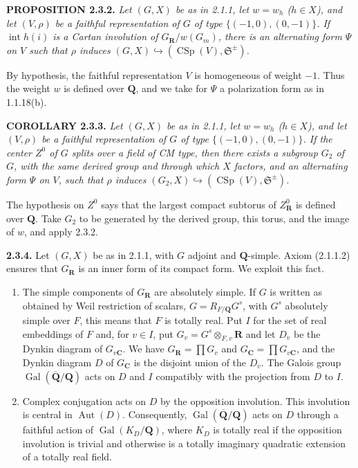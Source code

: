 \documentclass[10pt,a4paper]{article}
\begin{document}
\textbf{PROPOSITION 2.3.2.} \emph{Let \((G,X)\) be as in 2.1.1, let \(w=w_h\) (\(h\in X\)), and let \((V,\rho)\) be a faithful representation of \(G\) of type \(\{(-1,0),(0,-1)\}\). If \(\operatorname{int}h(i)\) is a Cartan involution of \(G_{\mathbf R}/w(G_m)\), there is an alternating form \(\Psi\) on \(V\) such that \(\rho\) induces \((G,X)\hookrightarrow(\operatorname{CSp}(V),\mathfrak S^{\pm})\).}

By hypothesis, the faithful representation \(V\) is homogeneous of weight \(-1\). Thus the weight \(w\) is defined over \(\mathbf Q\), and we take for \(\Psi\) a polarization form as in 1.1.18(b).

\textbf{COROLLARY 2.3.3.} \emph{Let \((G,X)\) be as in 2.1.1, let \(w=w_h\) (\(h\in X\)), and let \((V,\rho)\) be a faithful representation of \(G\) of type \(\{(-1,0),(0,-1)\}\). If the center \(Z^0\) of \(G\) splits over a field of CM type, then there exists a subgroup \(G_2\) of \(G\), with the same derived group and through which \(X\) factors, and an alternating form \(\Psi\) on \(V\), such that \(\rho\) induces \((G_2,X)\hookrightarrow(\operatorname{CSp}(V),\mathfrak S^{\pm})\).}

The hypothesis on \(Z^0\) says that the largest compact subtorus of \(Z_{\mathbf R}^0\) is defined over \(\mathbf Q\). Take \(G_2\) to be generated by the derived group, this torus, and the image of \(w\), and apply 2.3.2.

\textbf{2.3.4.} Let \((G,X)\) be as in 2.1.1, with \(G\) adjoint and \(\mathbf Q\)-simple. Axiom (2.1.1.2) ensures that \(G_{\mathbf R}\) is an inner form of its compact form. We exploit this fact.

\begin{enumerate}
\def\labelenumi{(\alph{enumi})}
\item
  The simple components of \(G_{\mathbf R}\) are absolutely simple. If \(G\) is written as obtained by Weil restriction of scalars, \(G=R_{F/\mathbf Q}G^s\), with \(G^s\) absolutely simple over \(F\), this means that \(F\) is totally real. Put \(I\) for the set of real embeddings of \(F\) and, for \(v\in I\), put \(G_v=G^s\otimes_{F,v}\mathbf R\) and let \(D_v\) be the Dynkin diagram of \(G_{v\mathbf C}\). We have \(G_{\mathbf R}=\prod G_v\) and \(G_{\mathbf C}=\prod G_{v\mathbf C}\), and the Dynkin diagram \(D\) of \(G_{\mathbf C}\) is the disjoint union of the \(D_v\). The Galois group \(\operatorname{Gal}(\overline{\mathbf Q}/\mathbf Q)\) acts on \(D\) and \(I\) compatibly with the projection from \(D\) to \(I\).
\item
  Complex conjugation acts on \(D\) by the opposition involution. This involution is central in \(\operatorname{Aut}(D)\). Consequently, \(\operatorname{Gal}(\overline{\mathbf Q}/\mathbf Q)\) acts on \(D\) through a faithful action of \(\operatorname{Gal}(K_D/\mathbf Q)\), where \(K_D\) is totally real if the opposition involution is trivial and otherwise is a totally imaginary quadratic extension of a totally real field.
\end{enumerate}
\end{document}
